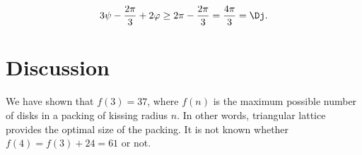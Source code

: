 \begin{enumerate}[label={\bf Case \arabic*: }, wide, labelwidth=!, labelindent=0pt]
$$3\psi - \frac{2\pi}{3} + 2\varphi\geq 2\pi - \frac{2\pi}{3} = \frac{4\pi}{3} = \Dj.$$


\end{enumerate}

\section{Discussion}

We have shown that $f(3) = 37$, where $f(n)$ is the maximum possible number of disks in a packing of kissing radius $n$. In other words, triangular lattice provides the optimal size of the packing. It is not known whether $f(4) = f(3) + 24 = 61$ or not.




